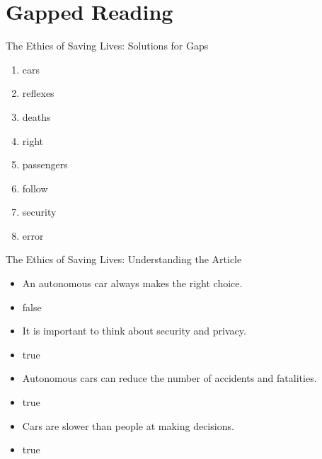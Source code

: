 \documentclass{beamer}
\begin{document}
    \section{Gapped Reading}

    \begin{frame}{The Ethics of Saving Lives: Solutions for Gaps}

        \begin{enumerate}[<+-|alert@+>]
            \item
                cars
            \item
                reflexes
            \item
                deaths
            \item
                right
            \item
                passengers
            \item
                follow
            \item
                security
            \item
                error
        \end{enumerate}
    \end{frame}

    \begin{frame}{The Ethics of Saving Lives: Understanding the Article}
        \begin{itemize}[<+-|alert@+>]
            \item
                An autonomous car always makes the right choice.
            \item[]
                false
            \item
                It is important to think about security and privacy.
            \item[]
                true
            \item
                Autonomous cars can reduce the number of accidents and fatalities.
            \item[]
                true
            \item
                Cars are slower than people at making decisions.
            \item[]
                true
        \end{itemize}
    \end{frame}
\end{document}
